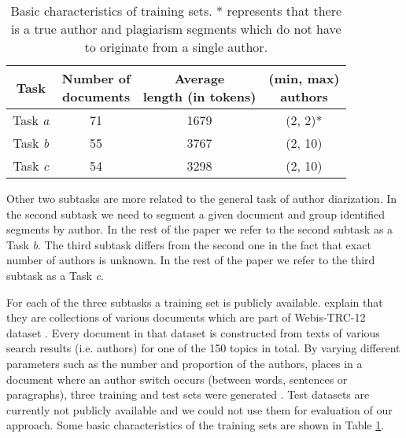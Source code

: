\documentclass[10pt, a4paper]{article}
\begin{document}
\begin{table}
	\caption{Basic characteristics of training sets. * represents that there is a true author and plagiarism segments which do not have to originate from a single author.}
	\label{tab:dataset-characteristics}
	\begin{center}
		\begin{tabular}{cccc}
			\toprule
			Task & \thead{Number of \\ documents} & \thead{Average \\ length (in tokens)} & \thead{(min, max)\\authors} \\
			\midrule
			Task \emph{a} & 71 & 1679 & (2, 2)*\\
			Task \emph{b} & 55 & 3767 & (2, 10)\\
			Task \emph{c} & 54 & 3298 & (2, 10)\\
			\bottomrule
		\end{tabular}
	\end{center}
\end{table}

Other two subtasks are more related to the general task of author diarization. In the second subtask we need to segment a given document and group identified segments by author. In the rest of the paper we refer to the second subtask as a Task \emph{b}. The third subtask differs from the second one in the fact that exact number of authors is unknown. In the rest of the paper we refer to the third subtask as a Task \emph{c}.

For each of the three subtasks a training set is publicly available\footnotemark[1]. \citet{rosso-2016} explain that they are collections of various documents which are part of Webis-TRC-12 dataset \citep{potthast-2013}. Every document in that dataset is constructed from texts of various search results (i.e. authors) for one of the 150 topics in total. By varying different parameters such as the number and proportion of the authors, places in a document where an author switch occurs (between words, sentences or paragraphs), three training and test sets were generated \citep{rosso-2016}. Test datasets are currently not publicly available and we could not use them for evaluation of our approach. Some basic characteristics of the training sets are shown in Table \ref{tab:dataset-characteristics}.

\end{document}
